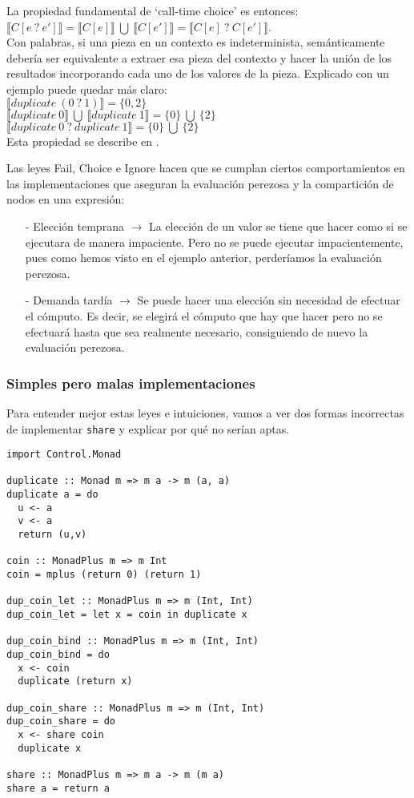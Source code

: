 \documentclass[class=article, crop=false]{standalone}
\begin{document}
La propiedad fundamental de `call-time choice' es entonces: \\
$\llbracket C[e \: ? \: e']\rrbracket
=\llbracket C[e]\rrbracket \:\bigcup\: \llbracket C[e']\rrbracket
=\llbracket C[e] \:?\: C[e']\rrbracket$. \\
Con palabras, si una pieza en un contexto es
indeterminista, semánticamente debería ser equivalente a extraer esa pieza del contexto y
hacer la unión de los resultados incorporando cada uno de los valores de la pieza. Explicado
con un ejemplo puede quedar más claro: \\
$\llbracket duplicate \: (0 \: ? \: 1)\rrbracket = \{0, 2\}$ \\
$\llbracket duplicate \:0\rrbracket\:\bigcup\:\llbracket duplicate \: 1\rrbracket
=\{0\} \:\bigcup\: \{2\}$ \\
$\llbracket duplicate \:0 \:?\: duplicate \:1\rrbracket = \{0\} \:\bigcup\: \{2\}$ \\
Esta propiedad se describe en \cite{lopez2007simple}.

Las leyes Fail, Choice e Ignore hacen que se cumplan ciertos comportamientos en las
implementaciones que aseguran la evaluación perezosa y la compartición de nodos en una
expresión:

\begin{itemize}
  \item[-] Elección temprana $\rightarrow$ La elección de un valor se tiene que hacer como si
  se ejecutara de manera impaciente. Pero no se puede ejecutar impacientemente, pues como
  hemos visto en el ejemplo anterior, perderíamos la evaluación perezosa.
  \item[-] Demanda tardía $\rightarrow$ Se puede hacer una elección sin necesidad de efectuar
  el cómputo. Es decir, se elegirá el cómputo que hay que hacer pero no se efectuará hasta
  que sea realmente necesario, consiguiendo de nuevo la evaluación perezosa.
\end{itemize}
\newpage

\subsubsection{Simples pero malas implementaciones}
Para entender mejor estas leyes e intuiciones, vamos a ver dos formas incorrectas de
implementar \verb`share` y explicar por qué no serían aptas.

\begin{verbatim}  
import Control.Monad

duplicate :: Monad m => m a -> m (a, a)
duplicate a = do
  u <- a
  v <- a
  return (u,v)

coin :: MonadPlus m => m Int
coin = mplus (return 0) (return 1)

dup_coin_let :: MonadPlus m => m (Int, Int)
dup_coin_let = let x = coin in duplicate x

dup_coin_bind :: MonadPlus m => m (Int, Int)
dup_coin_bind = do
  x <- coin
  duplicate (return x)

dup_coin_share :: MonadPlus m => m (Int, Int)
dup_coin_share = do
  x <- share coin
  duplicate x

share :: MonadPlus m => m a -> m (m a)
share a = return a
\end{verbatim}
\end{document}
